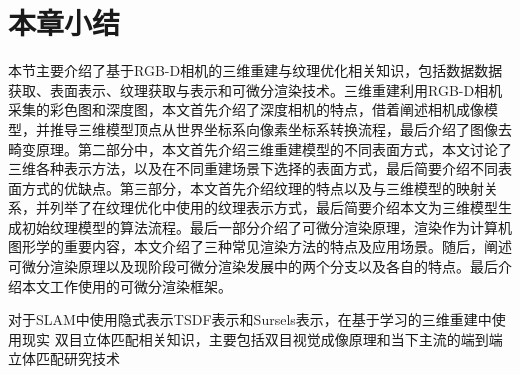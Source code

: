 \section{本章小结}
本节主要介绍了基于RGB-D相机的三维重建与纹理优化相关知识，包括数据数据获取、表面表示、纹理获取与表示和可微分渲染技术。三维重建利用RGB-D相机采集的彩色图和深度图，本文首先介绍了深度相机的特点，借着阐述相机成像模型，并推导三维模型顶点从世界坐标系向像素坐标系转换流程，最后介绍了图像去畸变原理。第二部分中，本文首先介绍三维重建模型的不同表面方式，本文讨论了三维各种表示方法，以及在不同重建场景下选择的表面方式，最后简要介绍不同表面方式的优缺点。第三部分，本文首先介绍纹理的特点以及与三维模型的映射关系，并列举了在纹理优化中使用的纹理表示方式，最后简要介绍本文为三维模型生成初始纹理模型的算法流程。最后一部分介绍了可微分渲染原理，渲染作为计算机图形学的重要内容，本文介绍了三种常见渲染方法的特点及应用场景。随后，阐述可微分渲染原理以及现阶段可微分渲染发展中的两个分支以及各自的特点。最后介绍本文工作使用的可微分渲染框架。



对于SLAM中使用隐式表示TSDF表示和Sursels表示，在基于学习的三维重建中使用现实
双目立体匹配相关知识，主要包括双目视觉成像原理和当下主流的端到端立体匹配研究技术